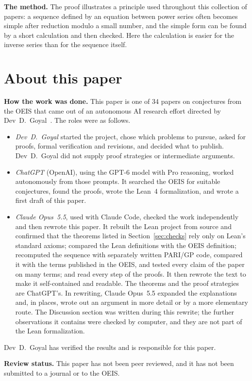\documentclass[11pt,a4paper]{article}
\theoremstyle{definition}
\theoremstyle{remark}
\newcommand{\para}[1]{\par\medskip\noindent\textbf{#1}\enspace}
\begin{document}
\para{The method.} The proof illustrates a principle used throughout this collection of papers: a sequence defined by
an equation between power series often becomes simple after reduction modulo a small number, and the simple form can
be found by a short calculation and then checked. Here the calculation is easier for the inverse series than for the
sequence itself.

\section*{About this paper}\label{sec:about}
\para{How the work was done.}
This paper is one of 34 papers on conjectures from the OEIS that came out of an autonomous AI research effort directed
by Dev~D.~Goyal~\cite{repo}. The roles were as follows.
\begin{itemize}
\item \emph{Dev~D.~Goyal} started the project, chose which problems to pursue, asked for proofs, formal verification and
revisions, and decided what to publish. Dev~D.~Goyal did not supply proof strategies or intermediate arguments.
\item \emph{ChatGPT} (OpenAI), using the GPT-6 model with Pro reasoning, worked autonomously from those prompts. It
searched the OEIS for suitable conjectures, found the proofs, wrote the Lean~4 formalization, and wrote a first draft
of this paper.
\item \emph{Claude Opus~5.5}, used with Claude Code, checked the work independently and then rewrote this paper. It
rebuilt the Lean project from source and confirmed that the theorems listed in Section~\ref{sec:checks} rely only on
Lean's standard axioms; compared the Lean definitions with the OEIS definition; recomputed the sequence with separately
written PARI/GP code, compared it with the terms published in the OEIS, and tested every claim of the paper on many
terms; and read every step of the proofs. It then rewrote the text to make it self-contained and readable. The
theorems and the proof strategies are ChatGPT's. In rewriting, Claude Opus~5.5 expanded the explanations and, in
places, wrote out an argument in more detail or by a more elementary route. The Discussion section was written during
this rewrite; the further observations it contains were checked by computer, and they are not part of the Lean
formalization.
\end{itemize}
Dev~D.~Goyal has verified the results and is responsible for this paper.

\para{Review status.} This paper has not been peer reviewed, and it has not been submitted to a journal or to the OEIS.
\end{document}
